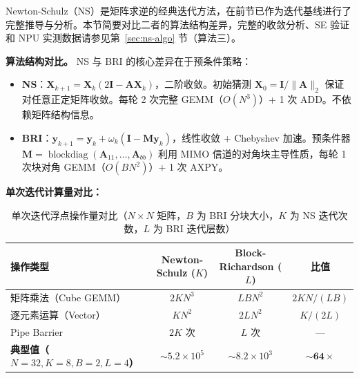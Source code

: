 \documentclass{CjC}
\begin{document}
    Newton-Schulz（NS）是矩阵求逆的经典迭代方法，在前节已作为迭代基线进行了完整推导与分析。本节简要对比二者的算法结构差异，完整的收敛分析、SE
    验证和 NPU 实测数据请参见第~\ref{sec:ns-algo} 节（算法三）。

    \textbf{算法结构对比。} NS 与 BRI 的核心差异在于预条件策略：

    \begin{itemize}
        \item \textbf{NS}：$\bm{X}_{k+1}= \bm{X}_{k}(2\bm{I}- \bm{A}\bm{X}_{k})$，二阶收敛。初始猜测
            $\bm{X}_{0}=\bm{I}/\|\bm{A}\|_{2}$ 保证对任意正定矩阵收敛。每轮 2 次完整
            GEMM（$O(N^{3})$）+ 1 次 ADD。不依赖矩阵结构信息。

        \item \textbf{BRI}：$\bm{y}_{k+1}= \bm{y}_{k}+ \omega_{k}(\bm{I}- \bm{M}\bm
            {y}_{k})$，线性收敛 + Chebyshev 加速。预条件器 $\bm{M}= \operatorname{blockdiag}
            (\bm{A}_{11},\dots,\bm{A}_{bb})$ 利用 MIMO 信道的对角块主导性质，每轮
            1 次块对角 GEMM（$O(B N^{2})$）+ 1 次 AXPY。
    \end{itemize}

    \textbf{单次迭代计算量对比：}

    \begin{table}[H]
        \centering
        \caption{单次迭代浮点操作量对比（$N\times N$ 矩阵，$B$ 为 BRI 分块大小，$K$
        为 NS 迭代次数，$L$ 为 BRI 迭代层数）}
        \begin{tabular}{l c c c}
            \toprule \textbf{操作类型}                            & \textbf{Newton-Schulz ($K$)} & \textbf{Block-Richardson ($L$)} & \textbf{比值}              \\
            \midrule 矩阵乘法（Cube GEMM）                          & $2K N^{3}$                   & $L B N^{2}$                     & $2K N / (L B)$           \\
            逐元素运算（Vector）                                     & $K N^{2}$                    & $2L N^{2}$                      & $K/(2L)$                 \\
            Pipe Barrier                                      & $2K$ 次                       & $L$ 次                           & —                        \\
            \midrule \textbf{典型值（$N{=}32,K{=}8,B{=}2,L{=}4$）} & $\sim 5.2\times 10^{5}$      & $\sim 8.2\times 10^{3}$         & $\mathbf{\sim 64\times}$ \\
            \bottomrule
        \end{tabular}
    \end{table}
\end{document}
